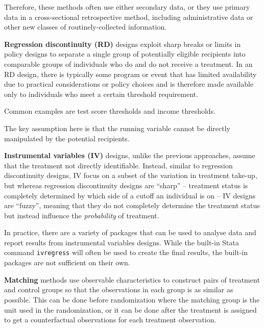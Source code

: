Therefore, these methods often use either secondary data,
or they use primary data in a cross-sectional retrospective method,
including administrative data or other new classes of routinely-collected information.


\textbf{Regression discontinuity (RD)} designs exploit sharp breaks or limits
in policy designs to separate a single group of potentially eligible recipients
into comparable groups of individuals who do and do not receive a treatment. 
In an RD design, there is typically some program or event
that has limited availability due to practical considerations or policy choices
and is therefore made available only to individuals who meet a certain threshold requirement.

Common examples are test score thresholds and income thresholds.

The key assumption here is that the running variable cannot be directly manipulated
by the potential recipients.


\textbf{Instrumental variables (IV)} designs, unlike the previous approaches,
assume that the treatment not directly identifiable.
Instead, similar to regression discontinuity designs,
IV focus on a subset of the variation in treatment take-up, 
but whereas regression discontinuity designs are ``sharp'' --
treatment status is completely determined by which side of a cutoff an individual is on --
IV designs are ``fuzzy'', meaning that they do not completely determine
the treatment status but instead influence the \textit{probability} of treatment.

In practice, there are a variety of packages that can be used
to analyse data and report results from instrumental variables designs.
While the built-in Stata command \texttt{ivregress} will often be used
to create the final results, the built-in packages are not sufficient on their own.


\textbf{Matching}
 methods use observable characteristics to construct pairs of treatment and control groups so that the observations in each group is as similar as possible. 
This can be done before randomization where the matching group is the unit used in the randomization,
or it can be done after the treatment is assigned to get a counterfactual observations for each treatment observation.

